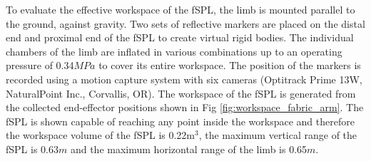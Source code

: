 \documentclass[letterpaper, 10 pt, conference]{ieeeconf}  %
\begin{document}
To evaluate the effective workspace of the fSPL, the limb is mounted parallel to the ground, against gravity. Two sets of reflective markers are placed on the distal end and proximal end of the fSPL to create virtual rigid bodies. The individual chambers of the limb are inflated in various combinations up to an operating pressure of 0.34$MPa$ to cover its entire workspace. The position of the markers is recorded using a motion capture system with six cameras (Optitrack Prime 13W, NaturalPoint Inc., Corvallis, OR). The workspace of the fSPL is generated from the collected end-effector positions shown in Fig \ref{fig:workspace_fabric_arm}. The fSPL is shown capable of reaching any point inside the workspace and therefore the workspace volume of the fSPL is 0.22m$^{3}$, the maximum vertical range of the fSPL is 0.63$m$ and the maximum horizontal range of the limb is 0.65$m$. 
% 
% 









\end{document}
